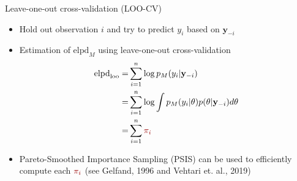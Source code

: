 \documentclass[10pt]{beamer}
\begin{document}
\begin{frame}{Leave-one-out cross-validation (LOO-CV)}

\begin{itemize}
\item Hold out observation $i$ and try to predict $y_i$ based on $\mathbf{y}_{-i}$
\item Estimation of $\text{elpd}_M$ using leave-one-out cross-validation
\small
\begin{align*}
\text{elpd}_\text{loo} = & \sum^n_{i=1} \log p_M(y_i|\mathbf{y}_{-i}) \\
 = & \sum^n_{i=1} \log \int p_M(y_i|\theta) p(\theta|\mathbf{y}_{-i})d\theta \\ = & \sum^n_{i=1} {\color{uured}\pi_i}
\end{align*}
\item Pareto-Smoothed Importance Sampling (PSIS) can be used to efficiently compute each ${\color{uured}\pi_i}$ (see Gelfand, 1996 and Vehtari et. al., 2019)
\end{itemize}

\end{frame}

\end{document}
